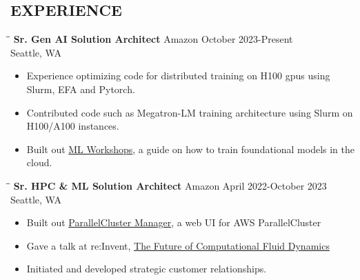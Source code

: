 \documentclass{res}
\begin{document}
\begin{resume}
\section{EXPERIENCE}
\vspace{-0.10in}
 \begin{tabbing}
   \hspace{2.5in}\= \hspace{2.6in}\= \kill %
    {\bf Sr. Gen AI Solution Architect} \>Amazon     \>October 2023-Present\\
                             \>Seattle, WA
   \end{tabbing}\vspace{-10pt}      %
   \begin{itemize}
   \setlength\itemsep{0em}
    \item Experience optimizing code for distributed training on H100 gpus using Slurm, EFA and Pytorch.
    \item Contributed code such as Megatron-LM training architecture using Slurm on H100/A100 instances.
    \item Built out \href{https://mlworkshops.com}{ML Workshops}, a guide on how to train foundational models in the cloud.
    \end{itemize}
\vspace{-0.10in}
 \begin{tabbing}
   \hspace{2.5in}\= \hspace{2.6in}\= \kill %
    {\bf Sr. HPC \& ML Solution Architect} \>Amazon     \>April 2022-October 2023\\
                             \>Seattle, WA
   \end{tabbing}\vspace{-10pt}      %
   \begin{itemize}
   \setlength\itemsep{0em}
\item Built out \href{https://pcluster.cloud/}{ParallelCluster Manager}, a web UI for AWS ParallelCluster
\item Gave a talk at re:Invent, \href{https://swsmith.cc/slides/CMP208-CFD-in-Cloud.pdf}{The Future of Computational Fluid Dynamics}
\item Initiated and developed strategic customer relationships.
    \end{itemize}
\vspace{-0.10in}
 \begin{tabbing}

\end{tabbing}
\end{resume}
\end{document}
